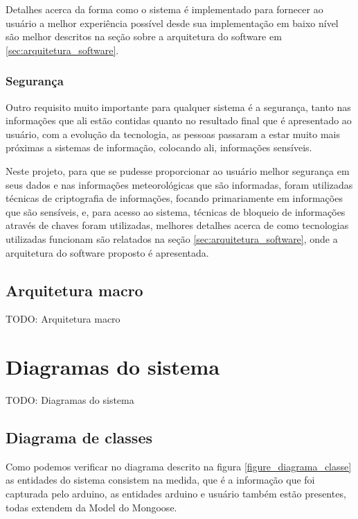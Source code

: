 Detalhes acerca da forma como o sistema é implementado para fornecer ao usuário a melhor experiência possível desde sua implementação em baixo nível são melhor descritos na seção sobre a arquitetura do software em \ref{sec:arquitetura_software}.

\subsubsection{Segurança}

Outro requisito muito importante para qualquer sistema é a segurança, tanto nas informações que ali estão contidas quanto no resultado final que é apresentado ao usuário, com a evolução da tecnologia, as pessoas passaram a estar muito mais próximas a sistemas de informação, colocando ali, informações sensíveis.

Neste projeto, para que se pudesse proporcionar ao usuário melhor segurança em seus dados e nas informações meteorológicas que são informadas, foram utilizadas técnicas de criptografia de informações, focando primariamente em informações que são sensíveis, e, para acesso ao sistema, técnicas de bloqueio de informações através de chaves foram utilizadas, melhores detalhes acerca de como tecnologias utilizadas funcionam são relatados na seção \ref{sec:arquitetura_software}, onde a arquitetura do software proposto é apresentada.

\subsection{Arquitetura macro}

TODO: Arquitetura macro

\section{Diagramas do sistema}

TODO: Diagramas do sistema

\subsection{Diagrama de classes}

Como podemos verificar no diagrama descrito na figura \ref{figure_diagrama_classe} as entidades do sistema consistem na medida, que é a informação que foi capturada pelo arduino, as entidades arduino e usuário também estão presentes, todas extendem da Model do Mongoose.

